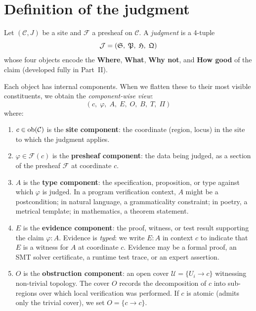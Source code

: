 \section{Definition of the judgment}
\label{sec:judgment:def}

\begin{definition}[Judgment]
\label{def:judgment}
Let $(\mathcal{C}, J)$ be a site and $\mathcal{F}$ a presheaf on
$\mathcal{C}$.  A \emph{judgment} is a 4-tuple
\[
  \mathcal{J} = (\mathfrak{S},\; \mathfrak{P},\; \mathfrak{H},\; \mathfrak{Q})
\]
whose four objects encode the \textbf{Where}, \textbf{What},
\textbf{Why not}, and \textbf{How good} of the claim (developed
fully in Part~II).

Each object has internal components.  When we flatten these to their
most visible constituents, we obtain the \emph{component-wise view}:
\[
  (c,\; \varphi,\; A,\; E,\; O,\; B,\; T,\; \Pi)
\]
where:
\begin{enumerate}[label=(\roman*),itemsep=4pt]
\item $c \in \mathrm{ob}(\mathcal{C})$ is the \textbf{site component}: the
  coordinate (region, locus) in the site to which the judgment
  applies.

\item $\varphi \in \mathcal{F}(c)$ is the \textbf{presheaf component}:
  the data being judged, as a section of the presheaf $\mathcal{F}$
  at coordinate $c$.

\item $A$ is the \textbf{type component}: the specification,
  proposition, or type against which $\varphi$ is judged.  In a
  program verification context, $A$ might be a postcondition; in
  natural language, a grammaticality constraint; in poetry, a metrical
  template; in mathematics, a theorem statement.

\item $E$ is the \textbf{evidence component}: the proof, witness, or
  test result supporting the claim $\varphi : A$.  Evidence is
  \emph{typed}: we write $E : A$ in context $c$ to indicate that $E$
  is a witness for $A$ at coordinate $c$.  Evidence may be a formal
  proof, an SMT solver certificate, a runtime test trace, or an
  expert assertion.

\item $O$ is the \textbf{obstruction component}: an open cover
  $\mathcal{U} = \{U_i \to c\}$ witnessing non-trivial topology.
  The cover $O$ records the decomposition of $c$ into sub-regions
  over which local verification was performed.  If $c$ is atomic
  (admits only the trivial cover), we set $O = \{c \to c\}$.


\end{enumerate}
\end{definition}
